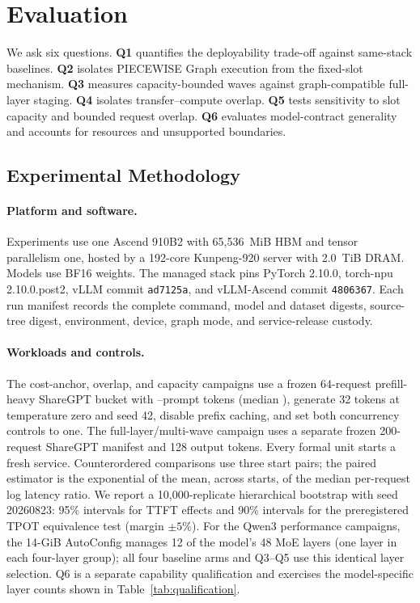\section{Evaluation}
\label{sec:evaluation}

We ask six questions. \textbf{Q1} quantifies the deployability trade-off
against same-stack baselines. \textbf{Q2} isolates PIECEWISE Graph execution
from the fixed-slot mechanism. \textbf{Q3} measures capacity-bounded waves
against graph-compatible full-layer staging. \textbf{Q4} isolates
transfer--compute overlap. \textbf{Q5} tests sensitivity to slot capacity and
bounded request overlap. \textbf{Q6} evaluates model-contract generality and
accounts for resources and unsupported boundaries.

\subsection{Experimental Methodology}

\paragraph{Platform and software.}
Experiments use one Ascend 910B2 with 65,536~MiB HBM and tensor parallelism
one, hosted by a 192-core Kunpeng-920 server with 2.0~TiB DRAM. Models use BF16
weights. The managed stack pins PyTorch 2.10.0, torch-npu 2.10.0.post2, vLLM
commit \texttt{ad7125a}, and vLLM-Ascend commit \texttt{4806367}. Each run
manifest records the complete command, model and dataset digests, source-tree
digest, environment, device, graph mode, and service-release custody.

\paragraph{Workloads and controls.}
The cost-anchor, overlap, and capacity campaigns use a frozen 64-request
prefill-heavy ShareGPT bucket with
\FormalPromptMin--\FormalPromptMax prompt tokens (median
\FormalPromptMedian), generate 32 tokens at temperature zero and seed 42,
disable prefix caching, and set both concurrency controls to one. The
full-layer/multi-wave campaign uses a
separate frozen 200-request ShareGPT manifest and 128 output tokens. Every
formal unit starts a fresh service. Counterordered comparisons use three start
pairs; the paired estimator is the exponential of the mean, across starts, of
the median per-request log latency ratio. We report a 10,000-replicate
hierarchical bootstrap with seed 20260823: 95\% intervals for TTFT effects and
90\% intervals for the preregistered TPOT equivalence test (margin $\pm5\%$).
For the Qwen3 performance campaigns, the 14-GiB AutoConfig manages 12 of the
model's 48 MoE layers (one layer in each four-layer group); all four baseline
arms and Q3--Q5 use this identical layer selection. Q6 is a separate
capability qualification and exercises the model-specific layer counts shown
in Table~\ref{tab:qualification}.


